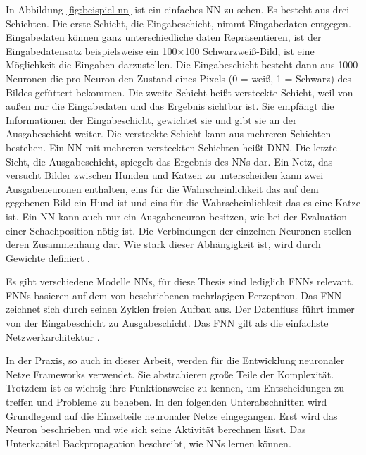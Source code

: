In Abbildung \autoref{fig:beispiel-nn} ist ein einfaches \acl{NN} zu sehen. Es besteht aus drei Schichten. Die erste Schicht, die Eingabeschicht, nimmt Eingabedaten entgegen. Eingabedaten können ganz unterschiedliche daten Repräsentieren, ist der Eingabedatensatz beispielsweise ein 100×100 Schwarzweiß-Bild, ist eine Möglichkeit die Eingaben darzustellen. Die Eingabeschicht besteht dann aus 1000 Neuronen die pro Neuron den Zustand eines Pixels (0 = weiß, 1 = Schwarz) des Bildes gefüttert bekommen. Die zweite Schicht heißt versteckte Schicht, weil von außen nur die Eingabedaten und das Ergebnis sichtbar ist. Sie empfängt die Informationen der Eingabeschicht, gewichtet sie und gibt sie an der Ausgabeschicht weiter. Die versteckte Schicht kann aus mehreren Schichten bestehen. Ein \ac{NN} mit mehreren versteckten Schichten heißt \ac{DNN}. Die letzte Sicht, die Ausgabeschicht, spiegelt das Ergebnis des \acp{NN} dar. Ein Netz, das versucht Bilder zwischen Hunden und Katzen zu unterscheiden kann zwei Ausgabeneuronen enthalten, eins für die Wahrscheinlichkeit das auf dem gegebenen Bild ein Hund ist und eins für die Wahrscheinlichkeit das es eine Katze ist. Ein \ac{NN} kann auch nur ein Ausgabeneuron besitzen, wie \zb{} bei der Evaluation einer Schachposition nötig ist. Die Verbindungen der einzelnen Neuronen stellen deren Zusammenhang dar. Wie stark dieser Abhängigkeit ist, wird durch Gewichte definiert \cite[S. 2--7]{krawczak2013multilayer}.

Es gibt verschiedene Modelle \aclp{NN}, für diese Thesis sind lediglich \acp{FNN} relevant. \acp{FNN} basieren auf dem von \citeauthor{rosenblatt1958perceptron} \cite{rosenblatt1958perceptron} beschriebenen mehrlagigen Perzeptron. Das \ac{FNN} zeichnet sich durch seinen Zyklen freien Aufbau aus. Der Datenfluss führt immer von der Eingabeschicht zu Ausgabeschicht. Das \ac{FNN} gilt als die einfachste Netzwerkarchitektur \cite{Schmidhuber2015}.

In der Praxis, so auch in dieser Arbeit, werden für die Entwicklung neuronaler Netze Frameworks verwendet. Sie abstrahieren große Teile der Komplexität. Trotzdem ist es wichtig ihre Funktionsweise zu kennen, um Entscheidungen zu treffen und Probleme zu beheben. In den folgenden Unterabschnitten wird Grundlegend auf die Einzelteile neuronaler Netze eingegangen. Erst wird das Neuron beschrieben und wie sich seine Aktivität berechnen lässt. Das Unterkapitel Backpropagation beschreibt, wie \acp{NN} lernen können.

